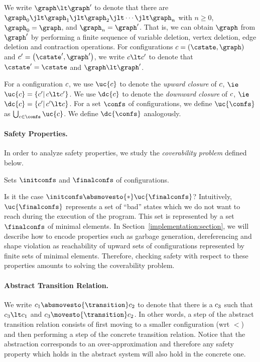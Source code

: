 %
%
We write $\graph\lt\graph'$ to denote that there are
$\graph_0\jlt\graph_1\jlt\graph_2\jlt\cdots\jlt\graph_n$ with $n\geq
0$, $\graph_0=\graph$, and $\graph_n=\graph'$.
%
That is, we can obtain $\graph$ from $\graph'$ by performing a finite
sequence of variable deletion, vertex deletion, edge deletion and contraction operations.
%
For configurations $\conf=\tuple{\cstate,\graph}$ and
$\conf'=\tuple{\cstate',\graph'}$, we write $\conf\lt\conf'$ to
denote that $\cstate'=\cstate$ and $\graph\lt\graph'$.
%

For a configuration $c$, we use $\uc{\conf}$ to denote the %
{\it upward closure} of $c$, $\ie$
$\uc{\conf}=\setcomp{\conf'}{\conf\lt\conf'}$.
%
We use $\dc{\conf}$ to denote the
{\it downward closure} of $c$, $\ie$
$\dc{\conf}=\setcomp{\conf'}{\conf'\lt\conf}$.
%
For a set $\confs$ of configurations, we define $\uc{\confs}$ as
$\bigcup_{\conf\in\confs}\uc{\conf}$.
%
We define $\dc{\confs}$ analogously.



\paragraph{\bf Safety Properties.}
In order to analyze safety properties, we
study the {\it coverability problem} defined below.
%

{%
  \item Sets $\initconfs$ and $\finalconfs$ of configurations.
}{%
Is it the case $\initconfs\absmovesto{*}\uc{\finalconfs}$?
}
\newline
Intuitively, $\uc{\finalconfs}$ represents a set of ``bad'' states which we do not 
want to reach during the execution of the program.
%
This set is represented by a set $\finalconfs$ of minimal elements.
%
In Section~\ref{implementation:section}, we will describe
how to encode properties such as garbage generation,
dereferencing and shape violation as reachability of upward sets of configurations represented by
finite sets of minimal elements.
%
Therefore, checking safety with respect to these properties
amounts to solving the coverability problem.


\paragraph{\bf Abstract Transition Relation.}
We write $\conf_1\absmovesto{\transition}\conf_2$ to denote that there is a $c_3$ such that
$\conf_3\lt\conf_1$ and $\conf_3\movesto{\transition}\conf_2$.
%
In other words, a step of the abstract transition relation consists of first moving to 
a smaller configuration (wrt $\lt$) and then performing a step of the concrete transition relation.
%
Notice that the abstraction corresponds to an over-approximation and therefore
any safety property which holds in the abstract system will also hold in the 
concrete one.
